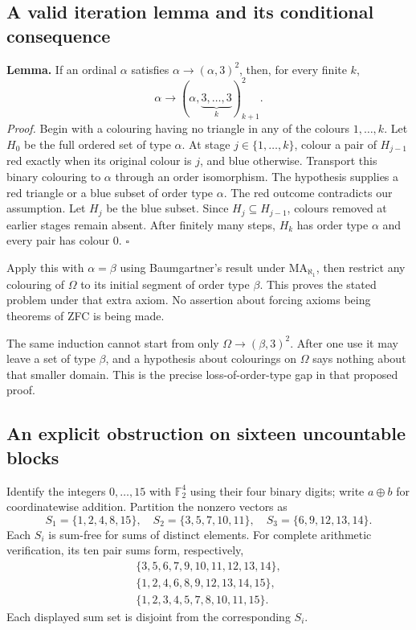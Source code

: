 \subsection{A valid iteration lemma and its conditional consequence}
\textbf{Lemma.} If an ordinal $\alpha$ satisfies $\alpha\to(\alpha,3)^2$, then, for every finite $k$,
\[
\alpha\to(\alpha,\underbrace{3,\ldots,3}_{k})^2_{k+1}.
\]
\textit{Proof.} Begin with a colouring having no triangle in any of the colours $1,\ldots,k$. Let $H_0$ be the full ordered set of type $\alpha$. At stage $j\in\{1,\ldots,k\}$, colour a pair of $H_{j-1}$ red exactly when its original colour is $j$, and blue otherwise. Transport this binary colouring to $\alpha$ through an order isomorphism. The hypothesis supplies a red triangle or a blue subset of order type $\alpha$. The red outcome contradicts our assumption. Let $H_j$ be the blue subset. Since $H_j\subseteq H_{j-1}$, colours removed at earlier stages remain absent. After finitely many steps, $H_k$ has order type $\alpha$ and every pair has colour $0$. \hfill$\square$

Apply this with $\alpha=\beta$ using Baumgartner's result under $\mathrm{MA}_{\aleph_1}$, then restrict any colouring of $\Omega$ to its initial segment of order type $\beta$. This proves the stated problem under that extra axiom. No assertion about forcing axioms being theorems of ZFC is being made.

The same induction cannot start from only $\Omega\to(\beta,3)^2$. After one use it may leave a set of type $\beta$, and a hypothesis about colourings on $\Omega$ says nothing about that smaller domain. This is the precise loss-of-order-type gap in that proposed proof.

\subsection{An explicit obstruction on sixteen uncountable blocks}
Identify the integers $0,\ldots,15$ with $\mathbb F_2^4$ using their four binary digits; write $a\oplus b$ for coordinatewise addition. Partition the nonzero vectors as
\[
S_1=\{1,2,4,8,15\},\quad
S_2=\{3,5,7,10,11\},\quad
S_3=\{6,9,12,13,14\}.
\]
Each $S_i$ is sum-free for sums of distinct elements. For complete arithmetic verification, its ten pair sums form, respectively,
\[
\begin{split}
\{3,5,6,7,9,10,11,12,13,14\},\\
\{1,2,4,6,8,9,12,13,14,15\},\\
\{1,2,3,4,5,7,8,10,11,15\}.
\end{split}
\]
Each displayed sum set is disjoint from the corresponding $S_i$.

